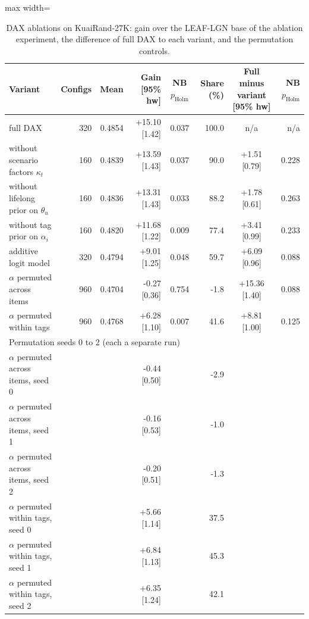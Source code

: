\begin{table}[tbp]
\centering
\footnotesize
\caption{DAX ablations on KuaiRand-27K: gain over the LEAF-LGN base of the ablation experiment, the difference of full DAX to each variant, and the permutation controls.}
\label{tab:ablate}
\begin{adjustbox}{max width=\linewidth}
\begin{tabular}{lrrrcrcr}
\toprule
Variant & Configs & Mean & Gain [95\% hw] & NB $p_{\mathrm{Holm}}$ & Share (\%) & Full minus variant [95\% hw] & NB $p_{\mathrm{Holm}}$ \\
\midrule
full DAX & 320 & 0.4854 & +15.10 [1.42] & 0.037 & 100.0 & n/a & n/a \\
without scenario factors $\kappa_t$ & 160 & 0.4839 & +13.59 [1.43] & 0.037 & 90.0 & +1.51 [0.79] & 0.228 \\
without lifelong prior on $\theta_u$ & 160 & 0.4836 & +13.31 [1.43] & 0.033 & 88.2 & +1.78 [0.61] & 0.263 \\
without tag prior on $\alpha_i$ & 160 & 0.4820 & +11.68 [1.22] & 0.009 & 77.4 & +3.41 [0.99] & 0.233 \\
additive logit model & 320 & 0.4794 & +9.01 [1.25] & 0.048 & 59.7 & +6.09 [0.96] & 0.088 \\
$\alpha$ permuted across items & 960 & 0.4704 & -0.27 [0.36] & 0.754 & -1.8 & +15.36 [1.40] & 0.088 \\
$\alpha$ permuted within tags & 960 & 0.4768 & +6.28 [1.10] & 0.007 & 41.6 & +8.81 [1.00] & 0.125 \\
\midrule
\multicolumn{8}{l}{Permutation seeds 0 to 2 (each a separate run)} \\
$\alpha$ permuted across items, seed 0 &  &  & -0.44 [0.50] &  & -2.9 &  &  \\
$\alpha$ permuted across items, seed 1 &  &  & -0.16 [0.53] &  & -1.0 &  &  \\
$\alpha$ permuted across items, seed 2 &  &  & -0.20 [0.51] &  & -1.3 &  &  \\
$\alpha$ permuted within tags, seed 0 &  &  & +5.66 [1.14] &  & 37.5 &  &  \\
$\alpha$ permuted within tags, seed 1 &  &  & +6.84 [1.13] &  & 45.3 &  &  \\
$\alpha$ permuted within tags, seed 2 &  &  & +6.35 [1.24] &  & 42.1 &  &  \\
\bottomrule
\end{tabular}
\end{adjustbox}
\par\smallskip

\end{table}
